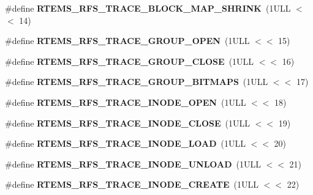 \begin{DoxyCompactItemize}
\#define {\bfseries R\+T\+E\+M\+S\+\_\+\+R\+F\+S\+\_\+\+T\+R\+A\+C\+E\+\_\+\+B\+L\+O\+C\+K\+\_\+\+M\+A\+P\+\_\+\+S\+H\+R\+I\+NK}~(1\+U\+L\+L $<$$<$ 14)
\item 
\mbox{\label{rtems-rfs-trace_8h_af8ea0c54ef86fb586ec9ead7b05f9d62}} 
\#define {\bfseries R\+T\+E\+M\+S\+\_\+\+R\+F\+S\+\_\+\+T\+R\+A\+C\+E\+\_\+\+G\+R\+O\+U\+P\+\_\+\+O\+P\+EN}~(1\+U\+L\+L $<$$<$ 15)
\item 
\mbox{\label{rtems-rfs-trace_8h_a9d063d4953ec102f7e367571f840b886}} 
\#define {\bfseries R\+T\+E\+M\+S\+\_\+\+R\+F\+S\+\_\+\+T\+R\+A\+C\+E\+\_\+\+G\+R\+O\+U\+P\+\_\+\+C\+L\+O\+SE}~(1\+U\+L\+L $<$$<$ 16)
\item 
\mbox{\label{rtems-rfs-trace_8h_ab52193dd6c95d2e94c87ce6f50b63235}} 
\#define {\bfseries R\+T\+E\+M\+S\+\_\+\+R\+F\+S\+\_\+\+T\+R\+A\+C\+E\+\_\+\+G\+R\+O\+U\+P\+\_\+\+B\+I\+T\+M\+A\+PS}~(1\+U\+L\+L $<$$<$ 17)
\item 
\mbox{\label{rtems-rfs-trace_8h_aac2def972061bbd5068ad30017454d53}} 
\#define {\bfseries R\+T\+E\+M\+S\+\_\+\+R\+F\+S\+\_\+\+T\+R\+A\+C\+E\+\_\+\+I\+N\+O\+D\+E\+\_\+\+O\+P\+EN}~(1\+U\+L\+L $<$$<$ 18)
\item 
\mbox{\label{rtems-rfs-trace_8h_a2461ebf33bde3e346de758674945fedf}} 
\#define {\bfseries R\+T\+E\+M\+S\+\_\+\+R\+F\+S\+\_\+\+T\+R\+A\+C\+E\+\_\+\+I\+N\+O\+D\+E\+\_\+\+C\+L\+O\+SE}~(1\+U\+L\+L $<$$<$ 19)
\item 
\mbox{\label{rtems-rfs-trace_8h_adc6edabef3eece7abbb9d66a2150c42c}} 
\#define {\bfseries R\+T\+E\+M\+S\+\_\+\+R\+F\+S\+\_\+\+T\+R\+A\+C\+E\+\_\+\+I\+N\+O\+D\+E\+\_\+\+L\+O\+AD}~(1\+U\+L\+L $<$$<$ 20)
\item 
\mbox{\label{rtems-rfs-trace_8h_afb5619425a16fb409af458cd0aaf4508}} 
\#define {\bfseries R\+T\+E\+M\+S\+\_\+\+R\+F\+S\+\_\+\+T\+R\+A\+C\+E\+\_\+\+I\+N\+O\+D\+E\+\_\+\+U\+N\+L\+O\+AD}~(1\+U\+L\+L $<$$<$ 21)
\item 
\mbox{\label{rtems-rfs-trace_8h_a8c1f36339778197be90f1d6ed3dc32d5}} 
\#define {\bfseries R\+T\+E\+M\+S\+\_\+\+R\+F\+S\+\_\+\+T\+R\+A\+C\+E\+\_\+\+I\+N\+O\+D\+E\+\_\+\+C\+R\+E\+A\+TE}~(1\+U\+L\+L $<$$<$ 22)
$$
\end{DoxyCompactItemize}
